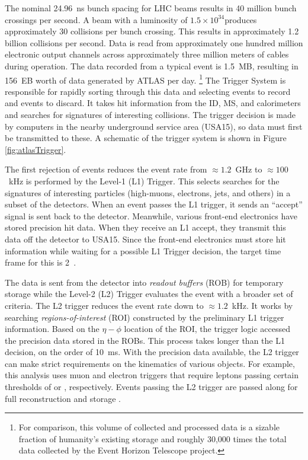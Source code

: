 The nominal 24.96~ns bunch spacing for LHC beams results in 40 million bunch crossings per second.
A beam with a luminosity of $1.5\times10^{34}$\cms produces approximately 30 collisions per bunch crossing.
This results in approximately 1.2 billion collisions per second.
Data is read from approximately one hundred million electronic output channels across approximately three million meters of cables during operation.
The data recorded from a typical event is 1.5~MB, resulting in 156~EB worth of data generated by ATLAS per day.
\footnote{For comparison, this volume of collected and processed data is a sizable fraction of humanity's existing storage and roughly 30,000 times the total data collected by the Event Horizon Telescope project.}
The Trigger System is responsible for rapidly sorting through this data and selecting events to record and events to discard.
It takes hit information from the ID, MS, and calorimeters and searches for signatures of interesting collisions.
The trigger decision is made by computers in the nearby underground service area (USA15), so data must first be transmitted to these.
A schematic of the trigger system is shown in Figure \ref{fig:atlasTrigger}.

The first rejection of events reduces the event rate from $\approx1.2$~GHz to $\approx100$~kHz is performed by the Level-1 (L1) Trigger.
This selects searches for the signatures of interesting particles (high-\pt muons, electrons, jets, and others) in a subset of the detectors.
When an event passes the L1 trigger, it sends an ``accept'' signal is sent back to the detector.
Meanwhile, various front-end electronics have stored precision hit data.
When they receive an L1 accept, they transmit this data off the detector to USA15.
Since the front-end electronics must store hit information while waiting for a possible L1 Trigger decision, the target time frame for this is 2~\us \cite{triggerTdr}.

The data is sent from the detector into \emph{readout buffers} (ROB) for temporary storage while the Level-2 (L2) Trigger evaluates the event with a broader set of criteria.
The L2 trigger reduces the event rate down to $\approx1.2$~kHz.
It works by searching \emph{regions-of-interest} (ROI) constructed by the preliminary L1 trigger information.
Based on the $\eta-\phi$ location of the ROI, the trigger logic accessed the precision data stored in the ROBs.
This process takes longer than the L1 decision, on the order of 10~ms.
With the precision data available, the L2 trigger can make strict requirements on the kinematics of various objects.
For example, this analysis uses muon and electron triggers that require leptons passing certain thresholds of \pt or \et, respectively.
Events passing the L2 trigger are passed along for full reconstruction and storage \cite{atlasTriggerNew}.
